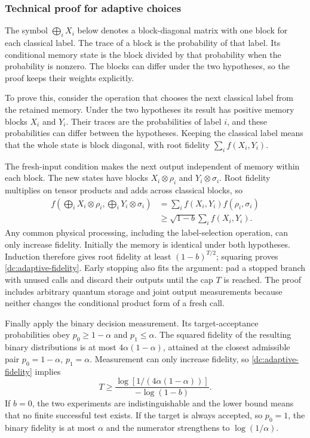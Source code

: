 \documentclass[11pt,a4paper]{article}
\numberwithin{equation}{section}
\begin{document}
\subsubsection*{Technical proof for adaptive choices}
The symbol $\bigoplus_i X_i$ below denotes a block-diagonal matrix with one
block for each classical label. The trace of a block is the probability of
that label. Its conditional memory state is the block divided by that
probability when the probability is nonzero. The blocks can differ under
the two hypotheses, so the proof keeps their weights explicitly.

To prove this, consider the operation that chooses the next classical label
from the retained memory.  Under the two hypotheses its result has positive
memory blocks $X_i$ and $Y_i$.  Their traces are the probabilities of label
$i$, and these probabilities can differ between the hypotheses.  Keeping
the classical label means that the whole state is block diagonal, with
root fidelity $\sum_i f(X_i,Y_i)$.

The fresh-input condition makes the next output independent of memory
within each block.  The new states have blocks
$X_i\otimes\rho_i$ and $Y_i\otimes\sigma_i$.  Root fidelity multiplies
on tensor products and adds across classical blocks, so
\begin{align*}
 f\left(\bigoplus_iX_i\otimes\rho_i,
        \bigoplus_iY_i\otimes\sigma_i\right)
 &=\sum_i f(X_i,Y_i)f(\rho_i,\sigma_i)\\
 &\geq\sqrt{1-b}\sum_i f(X_i,Y_i).
\end{align*}
Any common physical processing, including the label-selection operation,
can only increase fidelity.  Initially the memory is identical under both
hypotheses.  Induction therefore gives root fidelity at least
$(1-b)^{T/2}$; squaring proves \eqref{dc:adaptive-fidelity}.  Early stopping
also fits the argument: pad a stopped branch with unused calls and discard
their outputs until the cap $T$ is reached.  The proof includes arbitrary
quantum storage and joint output measurements because neither changes the
conditional product form of a fresh call.

Finally apply the binary decision measurement.  Its target-acceptance
probabilities obey $p_0\geq1-\alpha$ and $p_1\leq\alpha$.  The squared
fidelity of the resulting binary distributions is at most
$4\alpha(1-\alpha)$, attained at the closest admissible pair
$p_0=1-\alpha$, $p_1=\alpha$.  Measurement can only increase fidelity,
so \eqref{dc:adaptive-fidelity} implies
\begin{equation}
 T\geq\frac{\log[1/(4\alpha(1-\alpha))]}{-\log(1-b)}.
 \label{dc:binary-converse}
\end{equation}
If $b=0$, the two experiments are indistinguishable and the lower bound
means that no finite successful test exists.  If the target is always
accepted, so $p_0=1$, the binary fidelity is at most $\alpha$ and the
numerator strengthens to $\log(1/\alpha)$.
\end{document}
